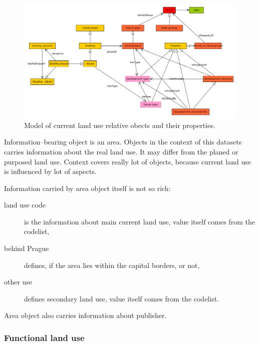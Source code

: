 \documentclass{lncs-template/llncs}
\begin{document}
\begin{figure}
 \includegraphics[width=1.0\textwidth]{images/SSVU.png}
 \caption{Model of current land use relative obects and their properties.}\label{fig:dat_clu}
\end{figure}


Information--bearing object is an area. Objects in the context of this datasets carries information about the real land use. It may differ from the planed or purposed land use. Context covers really lot of objects, because current land use is influenced by lot of aspects.

Information carried by area object itself is not so rich:
\begin{description}
\item[land use code] is the information about main current land use, value itself comes from the codelist,
\item[behind Prague] defines, if the area lies within the capital borders, or not,
\item[other use] defines secondary land use, value itself comes from the codelist.
\end{description}
Area object also carries information about publisher.

\subsubsection{Functional land use}

\end{document}
